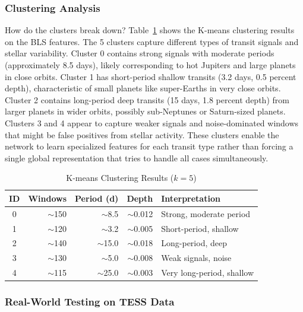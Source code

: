 \documentclass[letterpaper]{article} %
\begin{document}
\subsubsection{Clustering Analysis}
How do the clusters break down? Table~\ref{tab:bilstm_clusters} shows the K-means clustering results on the BLS features. The 5 clusters capture different types of transit signals and stellar variability. Cluster 0 contains strong signals with moderate periods (approximately 8.5 days), likely corresponding to hot Jupiters and large planets in close orbits. Cluster 1 has short-period shallow transits (3.2 days, 0.5 percent depth), characteristic of small planets like super-Earths in very close orbits. Cluster 2 contains long-period deep transits (15 days, 1.8 percent depth) from larger planets in wider orbits, possibly sub-Neptunes or Saturn-sized planets. Clusters 3 and 4 appear to capture weaker signals and noise-dominated windows that might be false positives from stellar activity. These clusters enable the network to learn specialized features for each transit type rather than forcing a single global representation that tries to handle all cases simultaneously.

\begin{table}[h]
    \centering
    \caption{K-means Clustering Results ($k=5$)}
    \label{tab:bilstm_clusters}
    \begin{tabular}{@{}crrrp{2.5cm}@{}}
        \toprule
        \textbf{ID} & \textbf{Windows} & \textbf{Period (d)} & \textbf{Depth} & \textbf{Interpretation} \\
        \midrule
            0 & $\sim$150 & $\sim$8.5 & $\sim$0.012 & Strong, moderate period \\
            1 & $\sim$120 & $\sim$3.2 & $\sim$0.005 & Short-period, shallow \\
            2 & $\sim$140 & $\sim$15.0 & $\sim$0.018 & Long-period, deep \\
            3 & $\sim$130 & $\sim$5.0 & $\sim$0.008 & Weak signals, noise \\
            4 & $\sim$115 & $\sim$25.0 & $\sim$0.003 & Very long-period, shallow \\
        \bottomrule
    \end{tabular}
\end{table}

\subsubsection{Real-World Testing on TESS Data}
\end{document}
